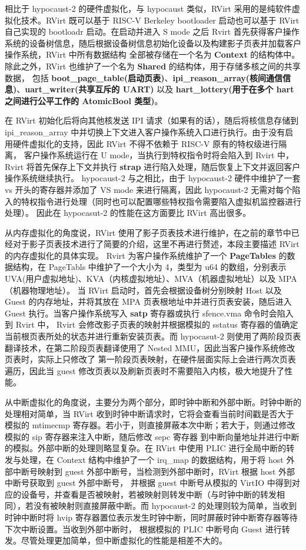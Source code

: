相比于 hypocaust-2 的硬件虚拟化，与 hypocaust 类似，RVirt 采用的是纯软件虚拟化技术。RVirt 既可以基于 RISC-V Berkeley bootloader 启动也可以基于
RVirt 自己实现的 bootloadr 启动。在启动并进入 S mode 之后 Rvirt 首先获得客户操作系统的设备树信息，随后根据设备树信息初始化设备以及构建影子页表并加载客户操作系统，RVirt 中所有数据结构
全部被存储在一个名为 \textbf{Context} 的结构体中。除此之外，RVirt 也维护了一个名为 \textbf{Shared} 的结构体，用于存储多核之间的共享数据，
包括 \textbf{boot\_page\_table(启动页表)}、\textbf{ipi\_reason\_array(核间通信信息)}、\textbf{uart\_writer(共享互斥的 UART)} 以及 \textbf{hart\_lottery(用于在多个 hart 之间进行公平工作的 AtomicBool 类型)}。

在 RVirt 初始化后将向其他核发送 IPI 请求（如果有的话），随后将核信息存储到 ipi\_reason\_array 中并切换上下文进入客户操作系统入口进行执行。由于没有启用硬件虚拟化的支持，因此 RVirt 不得不依赖于 RISC-V 原有的特权级进行隔离，
客户操作系统运行在 U mode，当执行到特权指令时将会陷入到 Rvirt 中，Rvirt 将首先保存上下文并执行 \textbf{strap} 进行陷入处理，随后恢复上下文并返回客户操作系统继续执行。
hypocaust-2 与之相比，由于 hypocaust-2 硬件中维护了一套 vs 开头的寄存器并添加了 VS mode 来进行隔离，因此 hypocaust-2 无需对每个陷入的特权指令进行处理（同时也可以配置哪些特权指令需要陷入虚拟机监控器进行处理）。
因此在 hypocasut-2 的性能在这方面要比 RVirt 高出很多。

从内存虚拟化的角度说，RVirt 使用了影子页表技术进行维护，在之前的章节中已经对于影子页表技术进行了简要的介绍，这里不再进行赘述，本段主要描述 RVirt 的内存虚拟化的具体实现。
Rvirt 为客户操作系统维护了一个 \textbf{PageTables} 的数据结构，在 PageTabls 中维护了一个大小为 4，类型为 u64 的数组，分别表示 UVA(用户虚拟地址)、KVA（内核虚拟地址）、MVA（机器虚拟地址）以及 MPA（机器物理地址）。
当 RVirt 启动时，首先会根据设备树分别映射 Host 以及 Guest 的内存地址，并将其放在 MPA 页表根地址中并进行页表安装，随后进入 Guest 执行。当客户操作系统写入 \textbf{satp} 寄存器或执行 sfence.vma 命令时会陷入到 Rvirt 中，
Rvirt 会修改影子页表的映射并根据模拟的 sstatus 寄存器的值确定当前根页表所处的状态并进行重新安装页表。而 hypocasut-2 则使用了两阶段页表翻译技术，在第二阶段页表翻译使用了 Nested MMU，因此当客户操作系统修改页表时，实际上只修改了
第一阶段页表映射，在硬件层面实际上会进行两次页表遍历，因此当 guest 修改页表以及刷新页表时不需要陷入内核，极大地提升了性能。

从中断虚拟化的角度说，主要分为两个部分，即时钟中断和外部中断。时钟中断的处理相对简单，当 RVirt 收到时钟中断请求时，它将会查看当前时间戳是否大于模拟的 mtimecmp 寄存器。若小于，则直接屏蔽本次中断；若大于，则通过修改模拟的 sip 寄存器来注入中断，随后修改 sepc 寄存器 
到中断向量地址并进行中断的模拟。外部中断的处理则略显复杂。在 RVirt 中使用 PLIC 进行全局中断的转发与处理，在 Context 结构中维护了一个 irq\_map 的数据结构，用于将 host 外部中断号映射到 guest 外部中断号，当检测到外部中断时，RVirt 根据 host 外部中断号获取到 guest 外部中断号，
并根据 guest 中断号从模拟的 VirtIO 中得到对应的设备号，并查看是否被映射，若被映射则转发中断（与时钟中断的转发相同），若没有被映射则直接屏蔽中断。而 hypocaust-2 的处理则较为简单，当收到时钟中断时将 hvip 寄存器置位表示发生时钟中断，同时屏蔽时钟中断寄存器等待下次中断设置。当收到外部中断时，
根据模拟的 PLIC 中断号向 Guest 进行转发。尽管处理更加简单，但中断虚拟化的性能是相差不大的。


